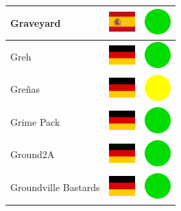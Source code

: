 \documentclass[12pt, a4paper, twoside]{report}
\begin{document}
\begin{center}
\begin{longtable}{|p{5cm}|p{2cm}|p{2cm}|}
 Graveyard                                                  & \includegraphics[width=1cm]{../img/flags/es} &   \includegraphics[width=1cm]{../likes/y} \\ \hline
 Greh                                                       & \includegraphics[width=1cm]{../img/flags/de} &   \includegraphics[width=1cm]{../likes/y} \\ \hline
 Greñas                                                     & \includegraphics[width=1cm]{../img/flags/de} &   \includegraphics[width=1cm]{../likes/m} \\ \hline
 Grime Pack                                                 & \includegraphics[width=1cm]{../img/flags/de} &   \includegraphics[width=1cm]{../likes/y} \\ \hline
 Ground2A                                                   & \includegraphics[width=1cm]{../img/flags/de} &   \includegraphics[width=1cm]{../likes/y} \\ \hline
 Groundville Bastards                                       & \includegraphics[width=1cm]{../img/flags/de} &   \includegraphics[width=1cm]{../likes/y} \\ \hline

\end{longtable}
\end{center}
\end{document}
